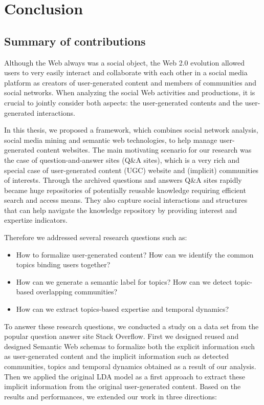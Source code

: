 \chapter{Conclusion}
\doublespacing
\label{chap:intro}
\minitoc

\section{Summary of contributions}
Although the Web always was a social object, the Web 2.0 evolution allowed users to very easily interact and collaborate with each other in a social media platform as creators of user-generated content and members of communities and social networks. When analyzing the social Web activities and productions, it is crucial to jointly consider both aspects: the user-generated contents and the user-generated interactions.

In this thesis, we proposed a framework, which combines social network analysis, social media mining and semantic web technologies, to help manage user-generated content websites. The main motivating scenario for our research was the case of question-and-answer sites (Q\&A sites), which is a very rich and special case of user-generated content (UGC) website and (implicit) communities of interests. Through the archived questions and answers Q\&A sites rapidly became huge repositories of potentially reusable knowledge requiring efficient search and access means. They also capture social interactions and structures that can help navigate the knowledge repository by providing interest and expertize indicators.

Therefore we addressed several research questions such as:
\begin{itemize}
\item{How to formalize user-generated content? How can we identify the common topics binding users together?}
\item{How can we generate a semantic label for topics? How can we detect topic-based overlapping communities?}
\item{How can we extract topics-based expertise and temporal dynamics?}
\end{itemize}

To answer these research questions, we conducted a study on a data set from the popular question answer site Stack Overflow. 
First we designed reused and designed Semantic Web schemas to formalize both the explicit information such as user-generated content and the implicit information such as detected communities, topics and temporal dynamics obtained as a result of our analysis.
Then we applied the original LDA model as a first approach to extract these implicit information from the original user-generated content. Based on the results and performances, we extended our work in three directions:

